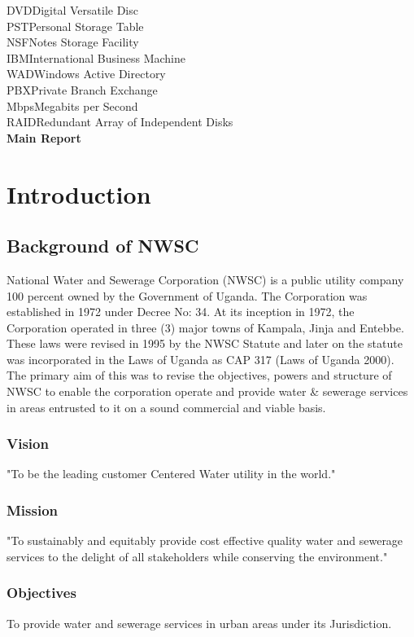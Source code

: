 \documentclass{article}
\begin{document}
DVD\dotfill Digital Versatile Disc\\
PST\dotfill Personal Storage Table\\
NSF\dotfill Notes Storage Facility\\
IBM\dotfill International Business Machine\\
WAD\dotfill Windows Active Directory\\
PBX\dotfill Private Branch Exchange\\
Mbps\dotfill Megabits per Second\\
RAID\dotfill Redundant Array of Independent Disks\\
\clearpage
{}
\newpage
\setcounter{page}{1}
\textbf{Main Report}\\
\section{Introduction}
\subsection{Background of NWSC}\cite{nwscwebsite}
National Water and Sewerage Corporation (NWSC) is a public utility company 100 percent owned by the Government of Uganda. The Corporation was established in 1972 under Decree No: 34. At its inception in 1972, the Corporation operated in three (3) major towns of Kampala, Jinja and Entebbe. These laws were revised in 1995 by the NWSC Statute and later on the statute was incorporated in the Laws of Uganda as CAP 317 (Laws of Uganda 2000). The primary aim of this was to revise the objectives, powers and structure of NWSC to enable the corporation operate and provide water \& sewerage services in areas entrusted to it on a sound commercial and viable basis.
\subsubsection{Vision}
"To be the leading customer Centered Water utility in the world." 
\subsubsection{Mission}
"To sustainably and equitably provide cost effective quality water and sewerage services to the delight of all stakeholders while conserving the environment."
\subsubsection{Objectives}
To provide water and sewerage services in urban areas under its Jurisdiction.
\end{document}
